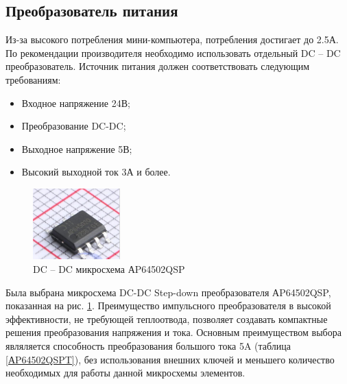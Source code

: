 \subsection{Преобразователь питания}
Из-за высокого потребления мини-компьютера, потребления достигает до 2.5А. По рекомендации производителя необходимо использовать отдельный DC – DC преобразователь. Источник питания должен соответствовать следующим требованиям:
\begin{itemize}
        \item Входное напряжение 24В;
        \item Преобразование DC-DC;
        \item Выходное напряжение 5В;
        \item Высокий выходной ток 3А и более.
\end{itemize}
\begin{figure}[H]
    \centering
    \includegraphics[width=0.3\textwidth]{Src/images/dc-dc.png}
    \caption{DC – DC микросхема АP64502QSP}
    \label{АP64502QSP}
\end{figure}
Была выбрана микросхема DC-DC Step-down преобразователя АP64502QSP, показанная на рис. \ref{АP64502QSP}. Преимущество импульсного преобразователя в высокой эффективности, не требующей теплоотвода, позволяет создавать компактные решения преобразования напряжения и тока. 
Основным преимуществом выбора являляется способность преобразования большого тока 5A (таблица \ref{АP64502QSPT}), без использования внешних ключей и меньшего количество необходимых для работы данной микросхемы элементов. 



